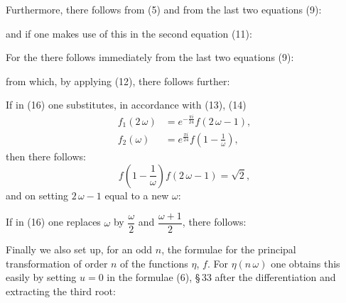 Furthermore, there follows from (5) and from the last two equations (9):

and if one makes use of this in the second equation (11):

For the  there follows immediately from the last two equations (9):

from which, by applying (12), there follows further:

If in (16) one substitutes, in accordance with (13), (14)
\[
\begin{aligned}
f_1(2\,\omega) &= e^{-\frac{\pi i}{24}} f(2\,\omega - 1),\\
f_2(\omega) &= e^{\frac{\pi i}{24}} f\!\left(1 - \frac{1}{\omega}\right),
\end{aligned}
\]
then there follows:
\[
f\!\left(1 - \frac{1}{\omega}\right) f(2\,\omega - 1) = \sqrt{2},
\]
and on setting $2\,\omega - 1$ equal to a new $\omega$:

If in (16) one replaces $\omega$ by $\dfrac{\omega}{2}$ and $\dfrac{\omega+1}{2}$, there follows:

Finally we also set up, for an odd $n$, the formulae for the principal transformation of order $n$ of the functions $\eta$, $f$. For $\eta(n\,\omega)$ one obtains this easily by setting $u = 0$ in the formulae (6), \S\,33 after the differentiation and extracting the third root:

